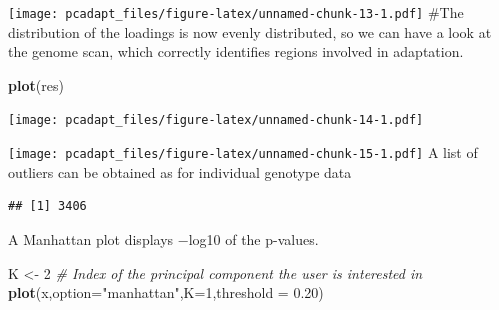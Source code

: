 \documentclass[]{article}
\newenvironment{Shaded}{\begin{snugshade}}{\end{snugshade}}
\newcommand{\KeywordTok}[1]{\textcolor[rgb]{0.13,0.29,0.53}{\textbf{#1}}}
\newcommand{\DataTypeTok}[1]{\textcolor[rgb]{0.13,0.29,0.53}{#1}}
\newcommand{\DecValTok}[1]{\textcolor[rgb]{0.00,0.00,0.81}{#1}}
\newcommand{\FloatTok}[1]{\textcolor[rgb]{0.00,0.00,0.81}{#1}}
\newcommand{\StringTok}[1]{\textcolor[rgb]{0.31,0.60,0.02}{#1}}
\newcommand{\CommentTok}[1]{\textcolor[rgb]{0.56,0.35,0.01}{\textit{#1}}}
\newcommand{\OtherTok}[1]{\textcolor[rgb]{0.56,0.35,0.01}{#1}}
\newcommand{\OperatorTok}[1]{\textcolor[rgb]{0.81,0.36,0.00}{\textbf{#1}}}
\newcommand{\NormalTok}[1]{#1}
\begin{document}
\texttt{[image: pcadapt\_files/figure-latex/unnamed-chunk-13-1.pdf]}
\#The distribution of the loadings is now evenly distributed, so we can
have a look at the genome scan, which correctly identifies regions
involved in adaptation.

\begin{Shaded}
\begin{Highlighting}[]
\KeywordTok{plot}\NormalTok{(res)}
\end{Highlighting}
\end{Shaded}

\texttt{[image: pcadapt\_files/figure-latex/unnamed-chunk-14-1.pdf]}

\begin{Shaded}
\end{Shaded}

\texttt{[image: pcadapt\_files/figure-latex/unnamed-chunk-15-1.pdf]} A
list of outliers can be obtained as for individual genotype data

\begin{Shaded}
\end{Shaded}

\begin{verbatim}
## [1] 3406
\end{verbatim}

A Manhattan plot displays −log10 of the p-values.

\begin{Shaded}
\begin{Highlighting}[]
\NormalTok{K <-}\StringTok{ }\DecValTok{2} \CommentTok{# Index of the principal component the user is interested in}
\KeywordTok{plot}\NormalTok{(x,}\DataTypeTok{option=}\StringTok{"manhattan"}\NormalTok{,}\DataTypeTok{K=}\DecValTok{1}\NormalTok{,}\DataTypeTok{threshold =} \FloatTok{0.20}\NormalTok{)}
\end{Highlighting}
\end{Shaded}
\end{document}
